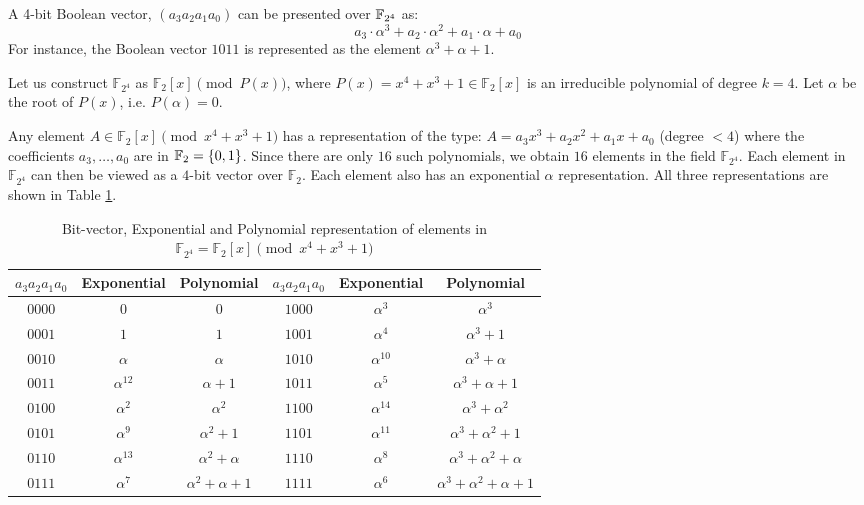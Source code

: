 \begin{Example}
A 4-bit Boolean vector, $(a_{3} a_{2} a_{1} a_{0})$
can be presented over ${\mathbb{F}}_{2^4}$ as: 
\begin{equation}
a_3 \cdot \alpha^3+a_2 \cdot \alpha^2+a_1 \cdot \alpha+a_0
\end{equation}
For instance, the Boolean vector $1011$ is represented as the element 
$\alpha^3+\alpha+1$.
\end{Example}

\begin{Example}\label{exp:1}
Let us construct $\mathbb{F}_{2^4}$ as $\mathbb{F}_2[x] \pmod{ P(x)}$, where
$P(x)=x^4+x^3+1 \in \mathbb{F}_2[x]$ is an irreducible polynomial of degree $k=4$. 
Let $\alpha$ be the root of $P(x)$, i.e. $P(\alpha)=0$. 

Any element $A \in \mathbb{F}_2[x] \pmod{ x^4 + x^3 + 1}$
has a representation of the type: $A = a_3 x^3 + a_2 x^2 +
a_1 x + a_0$ (degree $< 4$) where the coefficients $a_3, \dots, a_0$ are in ${\mathbb{F}}_2 =
\{0, 1\}$. Since there are only $16$ such polynomials, we obtain
$16$ elements in the field $\mathbb{F}_{2^4}$. Each element in
$\mathbb{F}_{2^4}$ can then be viewed as a $4$-bit vector over $\mathbb{F}_{2}$. 
Each element also has an exponential $\alpha$
representation. All three representations are shown in Table
\ref{tab:gfelement}.

\begin{table}[h]
\begin{center}
\caption{Bit-vector, Exponential and Polynomial representation of
elements in  $\mathbb{F}_{2^4} = \mathbb{F}_2[x] \pmod{x^4+x^3+1}$}\label{tab:gfelement} 
\begin{tabular}{|c|c|c||c|c|c|} 
\hline
$a_3a_2a_1a_0$ & Exponential & Polynomial     &$a_3a_2a_1a_0$ & Exponential & Polynomial  \\
\hline
$0000$        & $0$         & $0$            & $1000$ & $\alpha^3$ &  $\alpha^3$\\
\hline
$0001$        & $1$         & $1$            & $1001$ & $\alpha^4$ & $\alpha^3 + 1$\\
\hline
$0010$        & $\alpha$    & $\alpha$       & $1010$ & $\alpha^{10}$&$\alpha^3 + \alpha$  \\
\hline
$0011$        & $\alpha^{12}$& $\alpha + 1$   & $1011$ & $\alpha^5$ & $\alpha^3+\alpha+1$\\
\hline
$0100$        & $\alpha^2$  & $\alpha^2$     &  $1100$ & $\alpha^{14}$ & $\alpha^3 + \alpha^2$\\
\hline
$0101$        & $\alpha^9$   &$\alpha^2 + 1$ & $1101$  &$\alpha^{11}$  & $\alpha^3+\alpha^2+1$\\
\hline
$0110$        & $\alpha^{13}$& $\alpha^2 + \alpha$ & $1110$ & $\alpha^8$& $\alpha^3+\alpha^2+\alpha$\\
\hline
$0111$        &$\alpha^7 $ & $\alpha^2+\alpha+1$ & $1111$ &$\alpha^6$ & $\alpha^3+\alpha^2+\alpha+1$\\
\hline
\end{tabular}
\end{center}
\end{table}


\end{Example}
